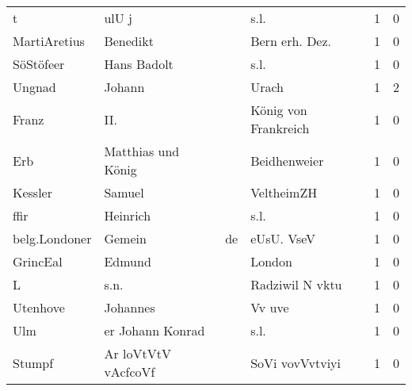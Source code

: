 \begin{center}
\begin{tiny}
\begin{longtabu}{llllrr}
                        t &                              ulU j &             &                                        s.l. &          1 &         0 \\
             MartiAretius &                           Benedikt &             &                             Bern erh. Dez.  &          1 &         0 \\
                SöStöfeer &                        Hans Badolt &             &                                        s.l. &          1 &         0 \\
                   Ungnad &                             Johann &             &                                       Urach &          1 &         2 \\
                    Franz &                                II. &             &                        König von Frankreich &          1 &         0 \\
                      Erb &                 Matthias und König &             &                                Beidhenweier &          1 &         0 \\
                  Kessler &                             Samuel &             &                                  VeltheimZH &          1 &         0 \\
                     ffir &                           Heinrich &             &                                        s.l. &          1 &         0 \\
            belg.Londoner &                             Gemein &          de &                                  eUsU. VseV &          1 &         0 \\
                 GrincEal &                             Edmund &             &                                      London &          1 &         0 \\
                        L &                               s.n. &             &                             Radziwil N vktu &          1 &         0 \\
                 Utenhove &                           Johannes &             &                                      Vv uve &          1 &         0 \\
                      Ulm &                   er Johann Konrad &             &                                        s.l. &          1 &         0 \\
                   Stumpf &                Ar loVtVtV vAcfcoVf &             &                             SoVi vovVvtviyi &          1 &         0 \\

\end{longtabu}
\end{tiny}
\end{center}
